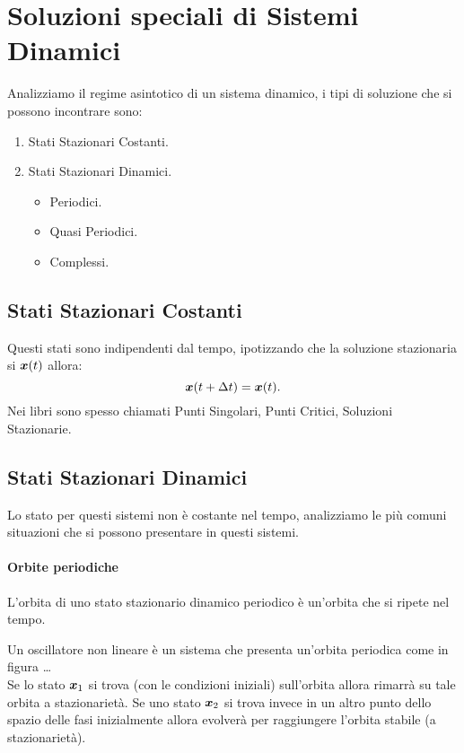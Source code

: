 \section{Soluzioni speciali di Sistemi Dinamici}%
\label{sub:Soluzioni speciali di Sistemi Dinamici}
Analizziamo il regime asintotico di un sistema dinamico, i tipi di soluzione che si possono incontrare sono:
\begin{enumerate}
    \item Stati Stazionari Costanti.
    \item Stati Stazionari Dinamici.
	\begin{itemize}
	    \item Periodici.
	    \item Quasi Periodici.
	    \item Complessi.
	\end{itemize}
\end{enumerate}
\subsection{Stati Stazionari Costanti}%
\label{sub:Stati stazionari Costanti}
Questi stati sono indipendenti dal tempo, ipotizzando che la soluzione stazionaria si $\boldsymbol{x}(t)$ allora:
\[
    \boldsymbol{x} (t + \Delta t)=\boldsymbol{x} (t)
.\] 
Nei libri sono spesso chiamati Punti Singolari, Punti Critici, Soluzioni Stazionarie.
\subsection{Stati Stazionari Dinamici}%
\label{sub:Stati Stazionari Dinamici}
Lo stato per questi sistemi non è costante nel tempo, analizziamo le più comuni situazioni che si possono presentare in questi sistemi.
\paragraph{Orbite periodiche}%
\label{par:Orbite periodiche}
L'orbita di uno stato stazionario dinamico periodico è un'orbita che si ripete nel tempo.
\begin{exmp}
    Un oscillatore non lineare è un sistema che presenta un'orbita periodica come in figura \ldots\\
    Se lo stato $\boldsymbol{x}_1$ si trova (con le condizioni iniziali) sull'orbita allora rimarrà su tale orbita a stazionarietà. Se uno stato $\boldsymbol{x}_2$ si trova invece in un altro punto dello spazio delle fasi inizialmente allora evolverà per raggiungere l'orbita stabile (a stazionarietà).
\end{exmp}
\noindent
